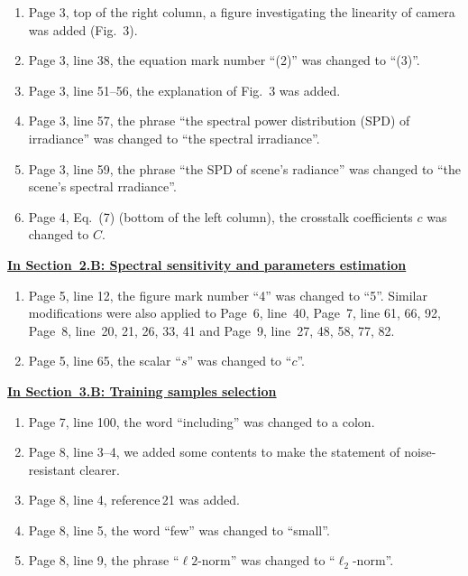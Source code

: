 \documentclass[12pt]{article}
\begin{document}
\begin{enumerate}[resume]
		\item Page 3, top of the right column, a figure investigating the linearity of camera was added (Fig.~3).
		
		\item Page 3, line 38, the equation mark number ``(2)'' was changed to ``(3)''.
		
		\item Page 3, line 51--56, the explanation of Fig.~3 was added.
		
		\item Page 3, line 57, the phrase ``the spectral power distribution (SPD) of irradiance'' was changed to ``the spectral irradiance''.
		
		\item Page 3, line 59, the phrase ``the SPD of scene's radiance'' was changed to ``the scene's spectral rradiance''.
		
		\item Page 4, Eq.~(7) (bottom of the left column), the crosstalk coefficients $c$ was changed to $C$.
	\end{enumerate}
	
	\noindent\underline{\textbf{{\large In Section~2.B: Spectral sensitivity and parameters estimation}}}
	
	\begin{enumerate}[resume]
		\item Page 5, line 12, the figure mark number ``4'' was changed to ``5''. Similar modifications were also applied to Page~6, line~40, Page~7, line 61, 66, 92, Page~8, line~20, 21, 26, 33, 41 and Page~9, line~27, 48, 58, 77, 82.
		
		\item Page 5, line 65, the scalar ``$s$'' was changed to ``$c$''.
	\end{enumerate}
	
	\noindent\underline{\textbf{{\large In Section~3.B: Training samples selection}}}
	
	\begin{enumerate}[resume]
		\item Page 7, line 100, the word ``including'' was changed to a colon.
		
		\item Page 8, line 3--4, we added some contents to make the statement of noise-resistant clearer.
		
		\item Page 8, line 4, reference\,21 was added.
		
		\item Page 8, line 5, the word ``few'' was changed to ``small''.
		
		\item Page 8, line 9, the phrase ``$\ell2$-norm'' was changed to ``$\ell_2$-norm''.
	\end{enumerate}
	
\end{document}
